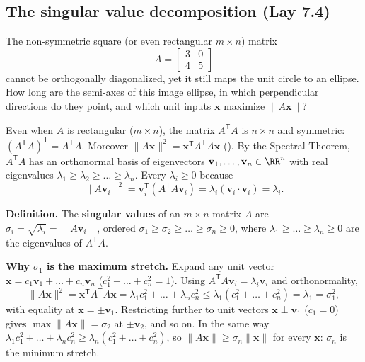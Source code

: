 \documentclass[10pt]{scrartcl}
\newcommand{\vv}[1]{\mathbf{#1}}
\begin{document}
\subsection{The singular value decomposition (Lay 7.4)}
\begin{qbox}
  The non-symmetric square (or even rectangular $m\times n$) matrix
  \[
    A=\begin{bmatrix}3&0\\4&5\end{bmatrix}
  \]
  cannot be orthogonally diagonalized, yet it still maps the unit circle to an ellipse. How long are the semi-axes of this image ellipse, in which perpendicular directions do they point, and which unit inputs $\vv x$ maximize $\|A\vv x\|$?
\end{qbox}

Even when $A$ is rectangular ($m\times n$), the matrix $A^{\mathsf T}A$ is $n\times n$ and symmetric: $(A^{\mathsf T}A)^{\mathsf T}=A^{\mathsf T}A$. Moreover $\|A\vv x\|^2=\vv x^{\mathsf T}A^{\mathsf T}A\vv x$ (). By the Spectral Theorem, $A^{\mathsf T}A$ has an orthonormal basis of eigenvectors $\vv v_1,\dots,\vv v_n\in\RR^n$ with real eigenvalues $\lambda_1\ge\lambda_2\ge\dots\ge\lambda_n$. Every $\lambda_i\ge 0$ because
\[
  \|A\vv v_i\|^2 = \vv v_i^{\mathsf T}(A^{\mathsf T}A\vv v_i) = \lambda_i(\vv v_i\cdot\vv v_i) = \lambda_i.
\]

\noindent\textbf{Definition.} The \textbf{singular values} of an $m\times n$ matrix $A$ are $\sigma_i=\sqrt{\lambda_i}=\|A\vv v_i\|$, ordered $\sigma_1\ge\sigma_2\ge\dots\ge\sigma_n\ge 0$, where $\lambda_1\ge\dots\ge\lambda_n\ge 0$ are the eigenvalues of $A^{\mathsf T}A$.

\medskip\noindent\textbf{Why $\sigma_1$ is the maximum stretch.} Expand any unit vector $\vv x=c_1\vv v_1+\dots+c_n\vv v_n$ ($c_1^2+\dots+c_n^2=1$). Using $A^{\mathsf T}A\vv v_i=\lambda_i\vv v_i$ and orthonormality,
\[
  \|A\vv x\|^2 = \vv x^{\mathsf T}A^{\mathsf T}A\vv x = \lambda_1 c_1^2 + \dots + \lambda_n c_n^2 \le \lambda_1(c_1^2+\dots+c_n^2) = \lambda_1 = \sigma_1^2,
\]
with equality at $\vv x=\pm\vv v_1$. Restricting further to unit vectors $\vv x\perp\vv v_1$ ($c_1=0$) gives $\max\|A\vv x\|=\sigma_2$ at $\pm\vv v_2$, and so on. In the same way $\lambda_1c_1^2+\dots+\lambda_nc_n^2\ge\lambda_n(c_1^2+\dots+c_n^2)$, so $\|A\vv x\|\ge\sigma_n\|\vv x\|$ for every $\vv x$: $\sigma_n$ is the minimum stretch.
\end{document}
